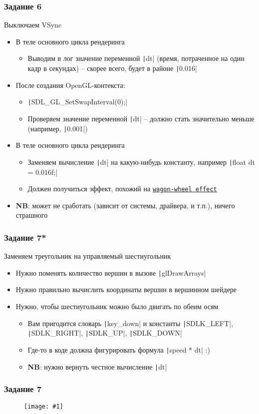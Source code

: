\documentclass[10pt]{beamer}
\newcommand{\slideimage}[1]{
  \begin{figure}
    \begin{adjustbox}{width=\textwidth, totalheight=\textheight-2\baselineskip-2\baselineskip,keepaspectratio}
      \texttt{[image: \#1]}
    \end{adjustbox}
  \end{figure}
}
\begin{document}
\begin{frame}[fragile]
\frametitle{Задание 6}
Выключаем VSync
\begin{itemize}
\item В теле основного цикла рендеринга
\begin{itemize}
\item Выводим в лог значение переменной \texttt|dt| (время, потраченное на один кадр в секундах) -- скорее всего, будет в районе \texttt|0.016|
\end{itemize}
\item После создания OpenGL-контекста:
\begin{itemize}
\item \texttt|SDL_GL_SetSwapInterval(0);|
\item Проверяем значение переменной \texttt|dt| -- должно стать значительно меньше (например, \texttt|0.001|)
\end{itemize}
\item В теле основного цикла рендеринга
\begin{itemize}
\item Заменяем вычисление \texttt|dt| на какую-нибудь константу, например \texttt|float dt = 0.016f;|
\item Должен получиться эффект, похожий на \href{https://en.wikipedia.org/wiki/Wagon-wheel_effect}{\texttt{wagon-wheel effect}}
\end{itemize}
\item \textbf{\alert{NB}}: может не сработать (зависит от системы, драйвера, и т.п.), ничего страшного
\end{itemize}
\end{frame}

\begin{frame}[fragile]
\frametitle{Задание 7*}
Заменяем треугольник на управляемый шестиугольник
\begin{itemize}
\item Нужно поменять количество вершин в вызове \texttt|glDrawArrays|
\item Нужно правильно вычислить координаты вершин в вершинном шейдере
\item Нужно, чтобы шестиугольник можно было двигать по обеим осям
\begin{itemize}
\item Вам пригодится словарь \texttt|key_down| и константы \texttt|SDLK_LEFT|, \texttt|SDLK_RIGHT|, \texttt|SDLK_UP|, \texttt|SDLK_DOWN|
\item Где-то в коде должна фигурировать формула \texttt|speed * dt| :)
\item \textbf{\alert{NB}}: нужно вернуть честное вычисление \texttt|dt|
\end{itemize}
\end{itemize}
\end{frame}

\begin{frame}
\frametitle{Задание 7}
\slideimage{7.png}
\end{frame}
\end{document}
